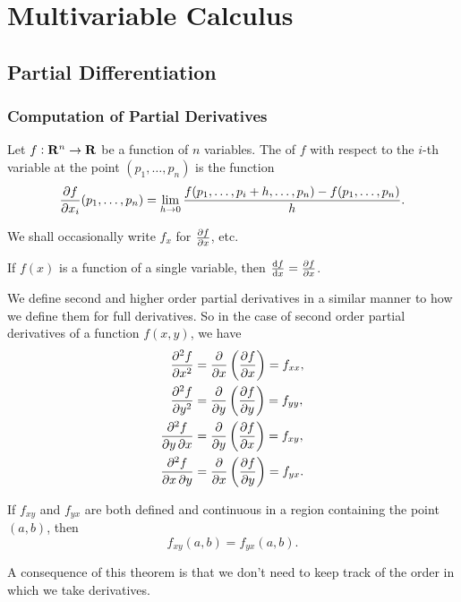 \chapter{Multivariable Calculus}
\section{Partial Differentiation}
\subsection{Computation of Partial Derivatives}
\begin{definition}
Let $f:\mathbf R^n\to\mathbf R$ be a function of $n$ variables. The  of $f$ with respect to the $i$-th variable at the point $(p_1,\dots,p_n)$ is the function
\[\pdv{f}{x_i}(p_1,\dots,p_n)=\lim_{h\to0}\frac{f(p_1,\dots,p_i+h,\dots,p_n)-f(p_1,\dots,p_n)}{h}.\]
\end{definition}

\begin{notation}
We shall occasionally write $f_x$ for $\pdv{f}{x}$, etc.
\end{notation}

\begin{remark}
If $f(x)$ is a function of a single variable, then $\dv{f}{x}=\pdv{f}{x}$.
\end{remark}

\begin{notation}
We define second and higher order partial derivatives in a similar manner to how we define them for full derivatives. So in the case of second order partial derivatives of a function $f(x,y)$, we have
\begin{align*}
\pdv[2]{f}{x}&=\pdv{}{x}\left(\pdv{f}{x}\right)=f_{xx},\\
\pdv[2]{f}{y}&=\pdv{}{y}\left(\pdv{f}{y}\right)=f_{yy},\\
\pdv{f}{y,x}&=\pdv{}{y}\left(\pdv{f}{x}\right)=f_{xy},\\
\pdv{f}{x,y}&=\pdv{}{x}\left(\pdv{f}{y}\right)=f_{yx}.
\end{align*}
\end{notation}

\begin{proposition}
If $f_{xy}$ and $f_{yx}$ are both defined and continuous in a region containing the point $(a,b)$, then 
\[f_{xy}(a,b)=f_{yx}(a,b).\]
\end{proposition}

A consequence of this theorem is that we don't need to keep track of the order in which we take derivatives.

